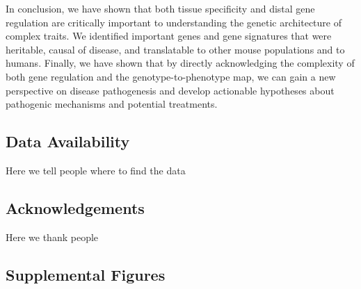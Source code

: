 \documentclass[
]{article}
\begin{document}
In conclusion, we have shown that both tissue specificity and distal
gene regulation are critically important to understanding the genetic
architecture of complex traits. We identified important genes and gene
signatures that were heritable, causal of disease, and translatable to
other mouse populations and to humans. Finally, we have shown that by
directly acknowledging the complexity of both gene regulation and the
genotype-to-phenotype map, we can gain a new perspective on disease
pathogenesis and develop actionable hypotheses about pathogenic
mechanisms and potential treatments.

\subsection{Data Availability}\label{data-availability}

Here we tell people where to find the data

\subsection{Acknowledgements}\label{acknowledgements}

Here we thank people

\pagebreak

\subsection{Supplemental Figures}\label{supplemental-figures}
\end{document}
